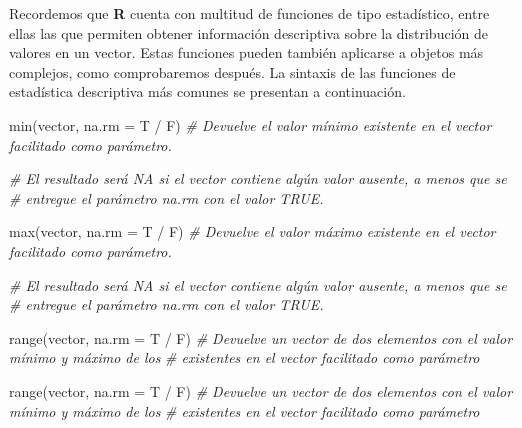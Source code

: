 \documentclass[
  12pt,
]{book}
\newenvironment{Shaded}{\begin{snugshade}}{\end{snugshade}}
\newcommand{\AttributeTok}[1]{\textcolor[rgb]{0.77,0.63,0.00}{#1}}
\newcommand{\CommentTok}[1]{\textcolor[rgb]{0.56,0.35,0.01}{\textit{#1}}}
\newcommand{\FunctionTok}[1]{\textcolor[rgb]{0.00,0.00,0.00}{#1}}
\newcommand{\NormalTok}[1]{#1}
\newcommand{\SpecialCharTok}[1]{\textcolor[rgb]{0.00,0.00,0.00}{#1}}
\begin{document}
Recordemos que \textbf{R} cuenta con multitud de funciones de tipo estadístico, entre ellas las que permiten
obtener información descriptiva sobre la distribución de valores en un vector. Estas
funciones pueden también aplicarse a objetos más complejos, como comprobaremos
después.
La sintaxis de las funciones de estadística descriptiva más comunes se presentan a continuación.

\begin{Shaded}
\begin{Highlighting}[]
\FunctionTok{min}\NormalTok{(vector, }\AttributeTok{na.rm =}\NormalTok{ T }\SpecialCharTok{/}\NormalTok{ F) }\CommentTok{\# Devuelve el valor mínimo existente en el vector facilitado como parámetro.}

\CommentTok{\# El resultado será NA si el vector contiene algún valor ausente, a menos que se}
\CommentTok{\# entregue el parámetro na.rm con el valor TRUE.}
\end{Highlighting}
\end{Shaded}

\begin{Shaded}
\begin{Highlighting}[]
\FunctionTok{max}\NormalTok{(vector, }\AttributeTok{na.rm =}\NormalTok{ T }\SpecialCharTok{/}\NormalTok{ F) }\CommentTok{\# Devuelve el valor máximo existente en el vector facilitado como parámetro.}

\CommentTok{\# El resultado será NA si el vector contiene algún valor ausente, a menos que se}
\CommentTok{\# entregue el parámetro na.rm con el valor TRUE.}
\end{Highlighting}
\end{Shaded}

\begin{Shaded}
\begin{Highlighting}[]
\FunctionTok{range}\NormalTok{(vector, }\AttributeTok{na.rm =}\NormalTok{ T }\SpecialCharTok{/}\NormalTok{ F) }\CommentTok{\# Devuelve un vector de dos elementos con el valor mínimo y máximo de los}
\CommentTok{\# existentes en el vector facilitado como parámetro}
\end{Highlighting}
\end{Shaded}

\begin{Shaded}
\begin{Highlighting}[]
\FunctionTok{range}\NormalTok{(vector, }\AttributeTok{na.rm =}\NormalTok{ T }\SpecialCharTok{/}\NormalTok{ F) }\CommentTok{\# Devuelve un vector de dos elementos con el valor mínimo y máximo de los}
\CommentTok{\# existentes en el vector facilitado como parámetro}
\end{Highlighting}
\end{Shaded}
\end{document}
